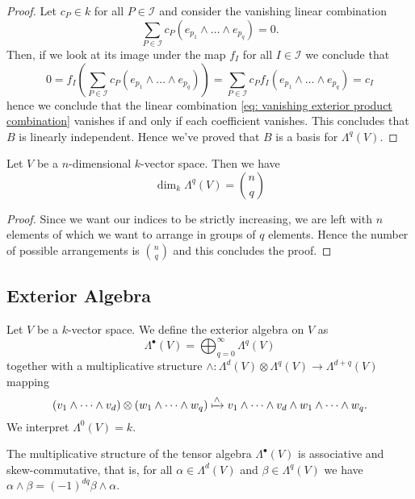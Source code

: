 \begin{proof}
  Let \(c_P \in k\) for all \(P \in \mathcal I\) and consider the vanishing
  linear combination
  \begin{equation}\label{eq: vanishing exterior product combination}
    \sum_{P \in \mathcal I} c_P (e_{p_1} \wedge \dots \wedge e_{p_q}) = 0.
  \end{equation}
  Then, if we look at its image under the map \(f_I\) for all \(I \in \mathcal
  I\) we conclude that
  \[
    0 = f_I\left( \sum_{P \in \mathcal I} c_P (e_{p_1} \wedge \dots \wedge
    e_{p_q}) \right) = \sum_{P \in \mathcal I} c_P f_I(e_{p_1} \wedge \dots \wedge
    e_{p_q}) = c_I
  \]
  hence we conclude that the linear combination \cref{eq: vanishing exterior
  product combination} vanishes if and only if each coefficient vanishes. This
  concludes that \(B\) is linearly independent. Hence we've proved that \(B\) is
  a basis for \(\Lambda^q(V)\).
\end{proof}

\begin{proposition}
  Let \(V\) be a \(n\)-dimensional \(k\)-vector space. Then we have
  \[
    \dim_k \Lambda^q(V) = \binom n q
  \]
\end{proposition}

\begin{proof}
  Since we want our indices to be strictly increasing, we are left with \(n\)
  elements of which we want to arrange in groups of \(q\) elements. Hence the
  number of possible arrangements is \(\binom n q\) and this concludes the
  proof.
\end{proof}

\subsection{Exterior Algebra}

\begin{definition}
  \label{def: exterior algebra}
  Let \(V\) be a \(k\)-vector space. We define the exterior algebra on \(V\) as
  \[
    \Lambda^\bullet(V) = \bigoplus_{q=0}^\infty \Lambda^q(V)
  \]
  together with a multiplicative structure \(\wedge: \Lambda^d(V) \otimes
  \Lambda^q(V) \to \Lambda^{d+q}(V)\) mapping
  \[
    (v_1 \wedge \dots \wedge v_d) \otimes (w_1 \wedge \dots \wedge w_q) \xmapsto
    \wedge v_1 \wedge \dots \wedge v_d \wedge w_1 \wedge \dots \wedge w_q.
  \]
  We interpret \(\Lambda^0(V) = k\).
\end{definition}

\begin{proposition}
  The multiplicative structure of the tensor algebra \(\Lambda^\bullet(V)\) is
  associative and skew-commutative, that is, for all \(\alpha \in \Lambda^d(V)\)
  and \(\beta \in \Lambda^q(V)\) we have \(\alpha \wedge \beta = (-1)^{d q} \beta
  \wedge \alpha\).
\end{proposition}

